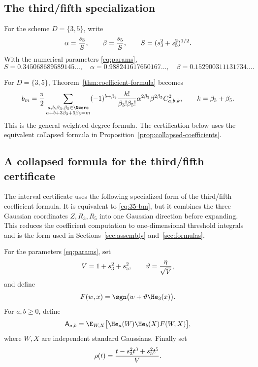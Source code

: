 \subsection{The third/fifth specialization}\label{subsec:third-fifth-coefficients}

\begin{definition}\label{def:third-fifth-coeff-data}
For the scheme $D=\{3,5\}$, write
\[
  \alpha={s_3\over S},\qquad \beta={s_5\over S},
  \qquad S=(s_3^2+s_5^2)^{1/2}.
\]
With the numerical parameters \eqref{eq:params},
\[
  S=0.345068689589145\ldots,
  \quad
  \alpha=0.988241617650167\ldots,
  \quad
  \beta=0.152900311131734\ldots .
\]
\end{definition}

For $D=\{3,5\}$, Theorem~\ref{thm:coefficient-formula} becomes
\begin{equation}\label{eq:35-bm}
  b_m={\pi\over2}
  \sum_{\substack{a,b,\beta_3,\beta_5\in\Nzero\\ a+b+3\beta_3+5\beta_5=m}}
  (-1)^{b+\beta_3}
  {k!\over \beta_3!\beta_5!}
  \alpha^{2\beta_3}\beta^{2\beta_5}
  C_{a,b,k}^2,
  \qquad k=\beta_3+\beta_5.
\end{equation}
This is the general weighted-degree formula.  The certification below uses the equivalent collapsed formula in Proposition~\ref{prop:collapsed-coefficients}.


\subsection{A collapsed formula for the third/fifth certificate}\label{subsec:collapsed-formula}

The interval certificate uses the following specialized form of the third/fifth coefficient formula.  It is equivalent to \eqref{eq:35-bm}, but it combines the three Gaussian coordinates $Z,R_3,R_5$ into one Gaussian direction before expanding.  This reduces the coefficient computation to one-dimensional threshold integrals and is the form used in Sections~\ref{sec:assembly} and~\ref{sec:formulas}.

\begin{definition}\label{def:collapsed-data}
For the parameters \eqref{eq:params}, set
\[
  V=1+s_3^2+s_5^2,
  \qquad
  \vartheta={\eta\over\sqrt V},
\]
and define
\[
  F(w,x)=\sgn\bigl(w+\vartheta\He_3(x)\bigr).
\]
For $a,b\ge0$, define
\begin{equation}\label{eq:mathsfAab}
  \mathsf A_{a,b}=\E_{W,X}\bigl[\He_a(W)\He_b(X)F(W,X)\bigr],
\end{equation}
where $W,X$ are independent standard Gaussians.  Finally set
\begin{equation}\label{eq:rho-collapsed}
  \rho(t)={t-s_3^2t^3+s_5^2t^5\over V}.
\end{equation}
\end{definition}

